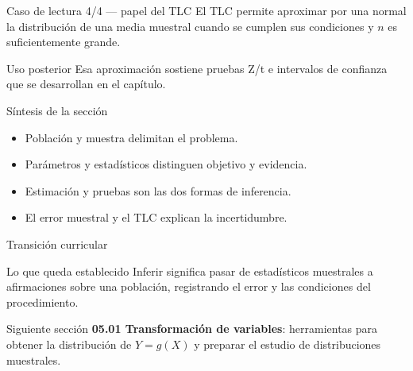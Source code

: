 \documentclass[10pt,aspectratio=169]{beamer}
\begin{document}
\begin{frame}{Caso de lectura 4/4 --- papel del TLC}
  \footnotesize
  El TLC permite aproximar por una normal la distribución de una media muestral
  cuando se cumplen sus condiciones y $n$ es suficientemente grande.
  \begin{block}{Uso posterior}
    Esa aproximación sostiene pruebas Z/t e intervalos de confianza que se
    desarrollan en el capítulo.
  \end{block}
\end{frame}

\begin{frame}{Síntesis de la sección}
  \footnotesize
  \begin{itemize}\itemsep=0.12cm
    \item Población y muestra delimitan el problema.
    \item Parámetros y estadísticos distinguen objetivo y evidencia.
    \item Estimación y pruebas son las dos formas de inferencia.
    \item El error muestral y el TLC explican la incertidumbre.
  \end{itemize}
\end{frame}

\begin{frame}{Transición curricular}
  \footnotesize
  \begin{block}{Lo que queda establecido}
    Inferir significa pasar de estadísticos muestrales a afirmaciones sobre una
    población, registrando el error y las condiciones del procedimiento.
  \end{block}
  \begin{alertblock}{Siguiente sección}
    \textbf{05.01 Transformación de variables}: herramientas para obtener la
    distribución de $Y=g(X)$ y preparar el estudio de distribuciones muestrales.
  \end{alertblock}
\end{frame}
\end{document}
